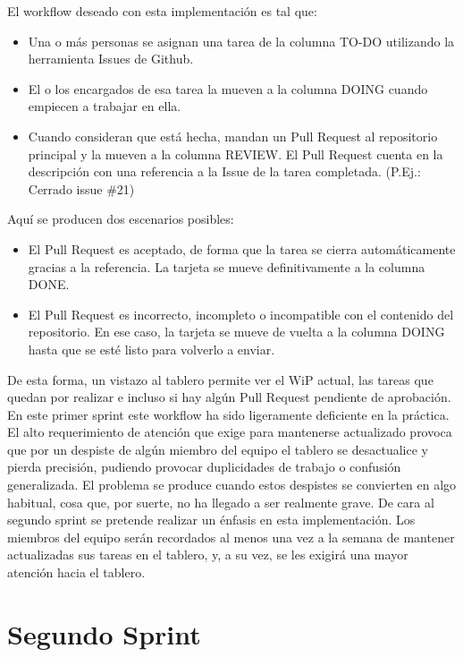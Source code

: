\documentclass[11pt,a4paper]{report}
\begin{document}
El workflow deseado con esta implementación es tal que:
\begin{itemize}
	\item Una o más personas se asignan una tarea de la columna TO-DO utilizando la herramienta Issues de Github.
	\item El o los encargados de esa tarea la mueven a la columna DOING cuando empiecen a trabajar en ella.
	\item Cuando consideran que está hecha, mandan un Pull Request al repositorio principal y la mueven a la columna REVIEW. El Pull Request cuenta en la descripción con una referencia a la Issue de la tarea completada. (P.Ej.: Cerrado issue \#21)
\end{itemize}
Aquí se producen dos escenarios posibles:
\begin{itemize}
\item El Pull Request es aceptado, de forma que la tarea se cierra automáticamente gracias a la referencia. La tarjeta se mueve definitivamente a la columna DONE.
\item El Pull Request es incorrecto, incompleto o incompatible con el contenido del repositorio. En ese caso, la tarjeta se mueve de vuelta a la columna DOING hasta que se esté listo para volverlo a enviar.
\end{itemize}
De esta forma, un vistazo al tablero permite ver el WiP actual, las tareas que quedan por realizar e incluso si hay algún Pull Request pendiente de aprobación.
En este primer sprint este workflow ha sido ligeramente deficiente en la práctica. El alto requerimiento de atención que exige para mantenerse actualizado provoca que por un despiste de algún miembro del equipo el tablero se desactualice y pierda precisión, pudiendo provocar duplicidades de trabajo o confusión generalizada. El problema se produce cuando estos despistes se convierten en algo habitual, cosa que, por suerte, no ha llegado a ser realmente grave.
De cara al segundo sprint se pretende realizar un énfasis en esta implementación. Los miembros del equipo serán recordados al menos una vez a la semana de mantener actualizadas sus tareas en el tablero, y, a su vez, se les exigirá una mayor atención hacia el tablero.
\section{Segundo Sprint}
\end{document}
